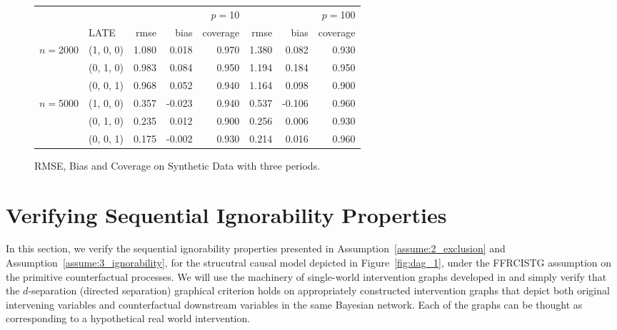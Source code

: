 \begin{figure}[H]
\centering
\begin{tabular}{ll|rrr|rrr}
\toprule
 &  & \multicolumn{3}{r}{$p=$10} & \multicolumn{3}{r}{$p=$100} \\
 & LATE & rmse & bias & coverage & rmse & bias & coverage \\
\midrule
\multirow[t]{3}{*}{$n=$2000} & (1, 0, 0) & 1.080 & 0.018 & 0.970 & 1.380 & 0.082 & 0.930 \\
 & (0, 1, 0) & 0.983 & 0.084 & 0.950 & 1.194 & 0.184 & 0.950 \\
 & (0, 0, 1) & 0.968 & 0.052 & 0.940 & 1.164 & 0.098 & 0.900 \\
\cline{1-8}
\multirow[t]{3}{*}{$n=$5000} & (1, 0, 0) & 0.357 & -0.023 & 0.940 & 0.537 & -0.106 & 0.960 \\
 & (0, 1, 0) & 0.235 & 0.012 & 0.900 & 0.256 & 0.006 & 0.930 \\
 & (0, 0, 1) & 0.175 & -0.002 & 0.930 & 0.214 & 0.016 & 0.960 \\
\cline{1-8}
\bottomrule
\end{tabular}
\caption{RMSE, Bias and Coverage on Synthetic Data with three periods.}\label{fig:experiments-3}
\end{figure}




























\newpage

\appendix 

\section{Verifying Sequential Ignorability Properties}\label{app:ignorability}

In this section, we verify the sequential ignorability properties presented in Assumption~\ref{assume:2_exclusion} and Assumption~\ref{assume:3_ignorability}, for the strucutral causal model depicted in Figure~\ref{fig:dag_1}, under the FFRCISTG assumption on the primitive counterfactual processes. We will use the machinery of single-world intervention graphs developed in \citep{richardson2013single} and simply verify that the $d$-separation (directed separation) graphical criterion holds on appropriately constructed intervention graphs that depict both original intervening variables and counterfactual downstream variables in the same Bayesian network. Each of the graphs can be thought as corresponding to a hypothetical real world intervention.

